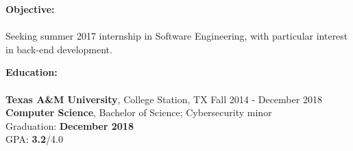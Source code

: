 \documentclass[12pt]{article}
\begin{document}
\begin{flushleft}
  \begin{outline}[compactitem]

    \newlength{\upspacelength}
    \setlength{\upspacelength}{-0.6px}
    \newcommand{\upspace}{\vspace{\upspacelength}}
    \newcommand{\zzz}[1]{\upspace \0 \textbf{#1} \\ \vspace{-0.8\baselineskip} \hrulefill \vspace{-2px} \\ }
    \let\oldOne\1\let\oldTwo\2\let\oldThree\3\let\oldFour\4
    \renewcommand{\1}{\upspace \oldOne  }
    \renewcommand{\2}{\upspace \oldTwo  }
    \renewcommand{\3}{\upspace \oldThree}
    \renewcommand{\4}{\upspace \oldFour }


    \zzz{Objective:}
    \1 Seeking summer 2017 internship in Software Engineering, with particular interest in back-end development.

    \zzz{Education:}
    \1 \textbf{Texas A\&M University}, College Station, TX \hfill Fall 2014 - December 2018
    \\ \textbf{Computer Science}, Bachelor of Science; Cybersecurity minor
    \\ Graduation: \textbf{December 2018}
    \\ GPA:  \textbf{3.2}/4.0


\end{outline}
\end{flushleft}
\end{document}

